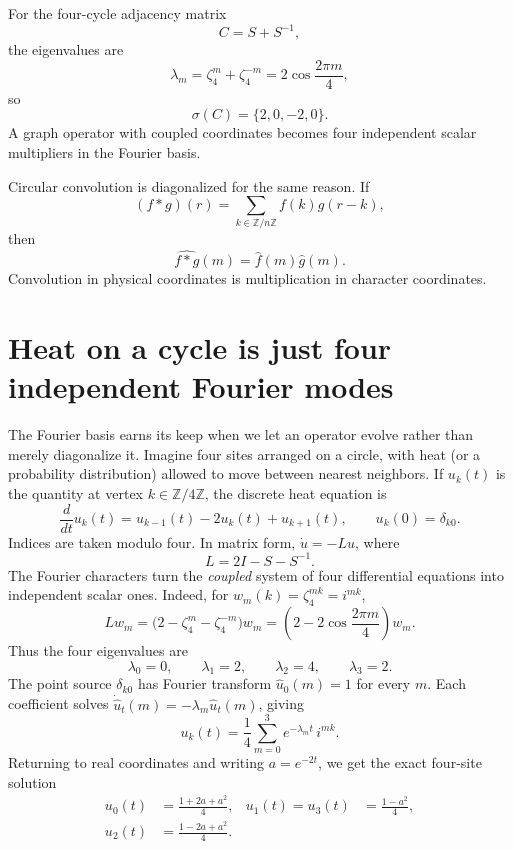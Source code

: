 For the four-cycle adjacency matrix
\[
  C=S+S^{-1},
\]
the eigenvalues are
\[
  \lambda_m
  =\zeta_4^m+\zeta_4^{-m}
  =2\cos\frac{2\pi m}{4},
\]
so
\[
  \sigma(C)=\{2,0,-2,0\}.
\]
A graph operator with coupled coordinates becomes four independent scalar multipliers in the Fourier basis.

Circular convolution is diagonalized for the same reason.  If
\[
  (f*g)(r)=
  \sum_{k\in\mathbb Z/n\mathbb Z}
  f(k)g(r-k),
\]
then
\[
  \widehat{f*g}(m)
  =\widehat f(m)\widehat g(m).
\]
Convolution in physical coordinates is multiplication in character coordinates.

\section{Heat on a cycle is just four independent Fourier modes}

The Fourier basis earns its keep when we let an operator evolve rather than merely diagonalize it. Imagine four sites arranged on a circle, with heat (or a probability distribution) allowed to move between nearest neighbors. If $u_k(t)$ is the quantity at vertex $k\in\mathbb Z/4\mathbb Z$, the discrete heat equation is
\[
 \frac{d}{dt}u_k(t)=u_{k-1}(t)-2u_k(t)+u_{k+1}(t),
 \qquad u_k(0)=\delta_{k0}.
\]
Indices are taken modulo four. In matrix form, $\dot u=-Lu$, where
\[
 L=2I-S-S^{-1}.
\]
The Fourier characters turn the \emph{coupled} system of four differential equations into independent scalar ones. Indeed, for
$w_m(k)=\zeta_4^{mk}=i^{mk}$,
\[
 Lw_m
 =\bigl(2-\zeta_4^m-\zeta_4^{-m}\bigr)w_m
 =\left(2-2\cos\frac{2\pi m}{4}\right)w_m.
\]
Thus the four eigenvalues are
\[
 \lambda_0=0,\qquad \lambda_1=2,\qquad
 \lambda_2=4,\qquad \lambda_3=2.
\]
The point source $\delta_{k0}$ has Fourier transform $\widehat u_0(m)=1$ for every $m$. Each coefficient solves
$\dot{\widehat u}_t(m)=-\lambda_m\widehat u_t(m)$, giving
\[
 \boxed{u_k(t)=\frac14\sum_{m=0}^3
 e^{-\lambda_m t}\,i^{mk}.}
\]
Returning to real coordinates and writing $a=e^{-2t}$, we get the exact four-site solution
\[
 \begin{aligned}
 u_0(t)&=\frac{1+2a+a^2}{4},&
 u_1(t)=u_3(t)&=\frac{1-a^2}{4},\\
 u_2(t)&=\frac{1-2a+a^2}{4}.&&
 \end{aligned}
\]

